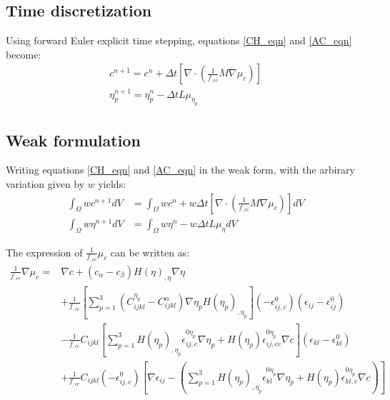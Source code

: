 \documentclass[11pt]{article}
\renewcommand{\=}[1]{\stackrel{#1}{=}} %
\theoremstyle{definition}
\theoremstyle{remark}
\begin{document}
\subsection{Time discretization}
Using forward Euler explicit time stepping, equations \ref{CH_eqn} and \ref{AC_eqn} become:
\begin{align}
c^{n+1} = c^{n}+\Delta t \left[\nabla \cdot \left(\frac{1}{f_{,cc}} M \nabla \mu_c \right) \right]\\
\eta_p^{n+1} = \eta_p^n -\Delta t L \mu_{\eta_p}
\end{align}

\subsection{Weak formulation}
Writing equations \ref{CH_eqn} and \ref{AC_eqn} in the weak form, with the arbirary variation given by $w$ yields:
\begin{align}
\int_\Omega w c^{n+1} dV &= \int_\Omega wc^{n}+w  \Delta t \left[\nabla \cdot \left(\frac{1}{f_{,cc}}  M \nabla \mu_c \right) \right] dV \label{CH_weak} \\
\int_\Omega w \eta^{n+1} dV &= \int_\Omega w \eta^{n}-w  \Delta t L \mu_{\eta} dV  \label{AC_weak}
\end{align}

The expression of $\frac{1}{f_{,cc}} \mu_c$ can be written as:
\begin{equation}
\begin{split}
\frac{1}{f_{,cc}}  \nabla \mu_c = & \nabla c + (c_{\alpha}-c_{\beta}) H(\eta)_{,\eta} \nabla \eta  \\
&+ \frac{1}{f_{,cc}} \left[ \sum_{p=1}^3 (C_{ijkl}^{\eta_p} - C_{ijkl}^{\alpha} )\nabla \eta_p H(\eta_p)_{,\eta_p} \right](-\epsilon_{ij,c}^0)(\epsilon_{ij} - \epsilon_{ij}^0) \\
&- \frac{1}{f_{,cc}} C_{ijkl} \left[  \sum_{p=1}^3 H(\eta_p)_{,\eta_p} \epsilon_{ij,c}^{0\eta_p} \nabla \eta_p + H(\eta_p) \epsilon_{ij,cc}^{0\eta_p} \nabla c \right](\epsilon_{kl}-\epsilon_{kl}^0)\\
&+ \frac{1}{f_{,cc}} C_{ijkl} (-\epsilon_{ij,c}^0) \left[ \nabla \epsilon_{ij} -  \left( \sum_{p=1}^3 H(\eta_p)_{,\eta_p} \epsilon_{kl}^{0\eta_p} \nabla \eta_p + H(\eta_p) \epsilon_{kl,c}^{0\eta_p} \nabla c \right) \right]
\end{split}
\end{equation}
\end{document}
